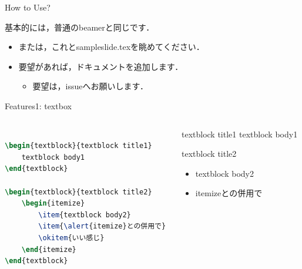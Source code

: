 \documentclass[aspectratio=1610,14pt]{beamer}
\begin{document}
\begin{frame}{How to Use?}
    \begin{textblock}{基本的には，普通のbeamerと同じです．}
        \begin{itemize}
            \item{または，これとsampleslide.texを眺めてください．}
            \item{要望があれば，ドキュメントを追加します．}
                \begin{itemize}
                    \item{要望は，issueへお願いします．}
                \end{itemize}
        \end{itemize}
    \end{textblock}
\end{frame}

\begin{frame}[fragile]{Features1: textbox}
    \begin{columns}
        \begin{column}{0.5\textwidth}
            \begin{lstlisting}[language=TeX]
% using like other blocks

\begin{textblock}{textblock title1}
    textblock body1
\end{textblock}

\begin{textblock}{textblock title2}
    \begin{itemize}
        \item{textblock body2}
        \item{\alert{itemize}との併用で}
        \okitem{いい感じ}
    \end{itemize}
\end{textblock}
            \end{lstlisting}
        \end{column}
        \begin{column}{0.5\textwidth}
            \begin{textblock}{textblock title1}
                textblock body1
            \end{textblock}
            \begin{textblock}{textblock title2}
                \begin{itemize}
                    \item{textblock body2}
                    \item{\alert{itemize}との併用で}
                \end{itemize}
            \end{textblock}
        \end{column}
    \end{columns}
\end{frame}
\end{document}
